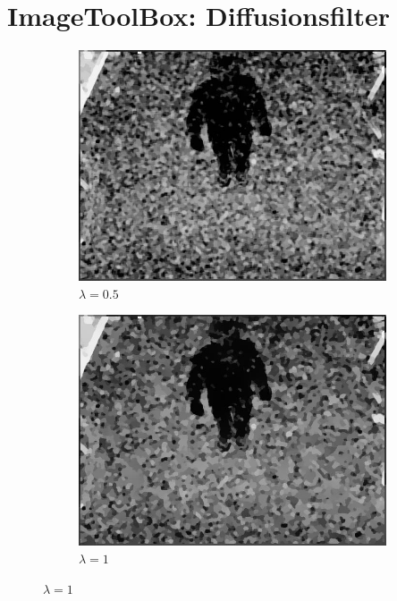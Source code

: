 \setcounter{section}{2}
\section{ImageToolBox: Diffusionsfilter }

\begin{figure}
	\centering
	\begin{subfigure}{.49\textwidth}
		\centering
		\includegraphics[width=.99\linewidth]{A3/lambda0.5.jpg}
		\caption{$\lambda=0.5$}
	\end{subfigure}
	\begin{subfigure}{.49\textwidth}
		\centering
		\includegraphics[width=.99\linewidth]{A3/lambda1.jpg}
		\caption{$\lambda=1$}
	\end{subfigure}

\end{figure}
